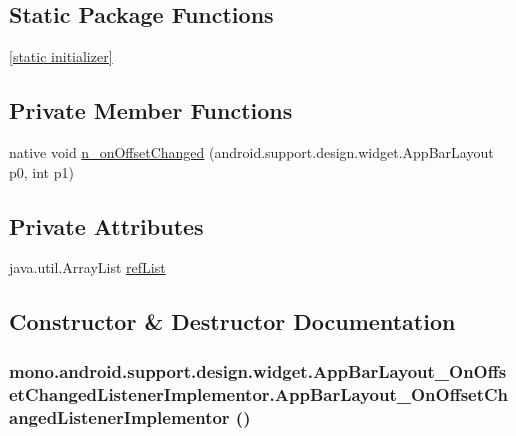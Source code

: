 \subsection*{Static Package Functions}
\begin{CompactItemize}
\item 
\hyperlink{classmono_1_1android_1_1support_1_1design_1_1widget_1_1_app_bar_layout___on_offset_changed_listener_implementor_1ccfd40f5fd0aa7debce17a791bdd7e2}{\mbox{[}static initializer\mbox{]}}
\end{CompactItemize}
\subsection*{Private Member Functions}
\begin{CompactItemize}
\item 
native void \hyperlink{classmono_1_1android_1_1support_1_1design_1_1widget_1_1_app_bar_layout___on_offset_changed_listener_implementor_c301d3b13d51c33ad07b7f4d1a1bd0fc}{n\_\-onOffsetChanged} (android.support.design.widget.AppBarLayout p0, int p1)
\end{CompactItemize}
\subsection*{Private Attributes}
\begin{CompactItemize}
\item 
java.util.ArrayList \hyperlink{classmono_1_1android_1_1support_1_1design_1_1widget_1_1_app_bar_layout___on_offset_changed_listener_implementor_de49459337458d3b2e5ac21d86f11e73}{refList}
\end{CompactItemize}


\subsection{Constructor \& Destructor Documentation}
\hypertarget{classmono_1_1android_1_1support_1_1design_1_1widget_1_1_app_bar_layout___on_offset_changed_listener_implementor_58c0b48a6627c921e900f090155d0f0b}{
\subsubsection[{AppBarLayout\_\-OnOffsetChangedListenerImplementor}]{\setlength{\rightskip}{0pt plus 5cm}mono.android.support.design.widget.AppBarLayout\_\-OnOffsetChangedListenerImplementor.AppBarLayout\_\-OnOffsetChangedListenerImplementor ()}}
\label{classmono_1_1android_1_1support_1_1design_1_1widget_1_1_app_bar_layout___on_offset_changed_listener_implementor_58c0b48a6627c921e900f090155d0f0b}




